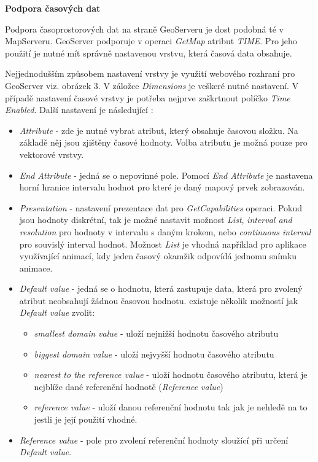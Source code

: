 \textbf{Podpora časových dat}

Podpora časoprostorových dat na straně GeoServeru je dost podobná té v
MapServeru. GeoServer podporuje v operaci \textit{GetMap} atribut
\textit{TIME}. Pro jeho použití je nutné mít správně nastavenou
vrstvu, která časová data obsahuje.

Nejjednodušším způsobem nastavení vrstvy je využití webového rozhraní
pro GeoServer viz. obrázek 3. V záložce \textit{Dimensions} je veškeré
nutné nastavení. V případě nastavení časové vrstvy je potřeba nejprve
zaškrtnout políčko \textit{Time Enabled}. Další nastavení je
následující \cite{geoserver-layer-edit}:

\begin{itemize}
	\item \textit{Attribute} - zde je nutné vybrat atribut, který
obsahuje časovou složku. Na základě něj jsou zjištěny časové
hodnoty. Volba atributu je možná pouze pro vektorové vrstvy.
	\item \textit{End Attribute} - jedná se o nepovinné
pole. Pomocí \textit{End Attribute} je nastavena horní hranice
intervalu hodnot pro které je daný mapový prvek zobrazován.
	\item \textit{Presentation} - nastavení prezentace dat pro
\textit{GetCapabilities} operaci. Pokud jsou hodnoty diskrétní, tak je
možné nastavit možnost \textit{List}, \textit{interval and resolution}
pro hodnoty v intervalu s daným krokem, nebo \textit{continuous
interval} pro souvislý interval hodnot. Možnost \textit{List} je
vhodná například pro aplikace využívající animací, kdy jeden časový
okamžik odpovídá jednomu snímku animace.
	\item \textit{Default value} - jedná se o hodnotu, která
zastupuje data, která pro zvolený atribut neobsahují žádnou časovou
hodnotu. existuje několik možností jak \textit{Default value} zvolit:
	\begin{itemize}
		\item \textit{smallest domain value} - uloží nejnižší
hodnotu časového atributu
		\item \textit{biggest domain value} - uloží nejvyšší
hodnotu časového atributu
		\item \textit{nearest to the reference value} - uloží
hodnotu časového atributu, která je nejblíže dané referenční hodnotě
(\textit{Reference value})
		\item \textit{reference value} - uloží danou
referenční hodnotu tak jak je nehledě na to jestli je její použití
vhodné.
	\end{itemize}
	\item \textit{Reference value} - pole pro zvolení referenční
hodnoty sloužící při určení \textit{Default value}.
\end{itemize}

